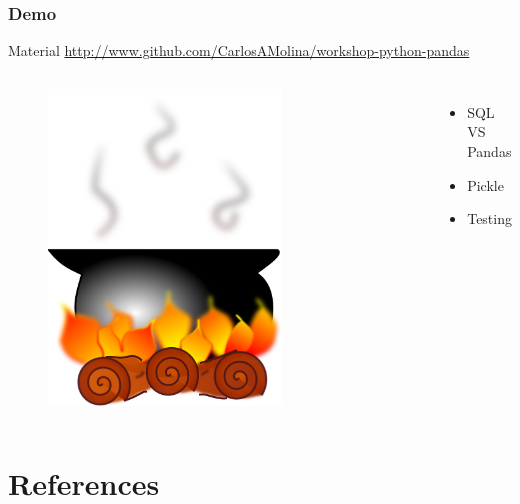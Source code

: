 \documentclass{beamer}
\begin{document}
\begin{frame}
\frametitle{Demo}

\begin{block}{Material}
\href{https://github.com/CarlosAMolina/workshop-python-pandas}{http://www.github.com/CarlosAMolina/workshop-python-pandas}
\end{block}

\begin{columns}[c] %

  \begin{figure}
    \centering
    \includegraphics[width=0.7\textwidth]{olla.png}
  \end{figure}

\begin{itemize}
\item SQL VS Pandas
\item Pickle
\item Testing
\end{itemize}

\end{columns}

\end{frame}

\section{References}
\end{document}
